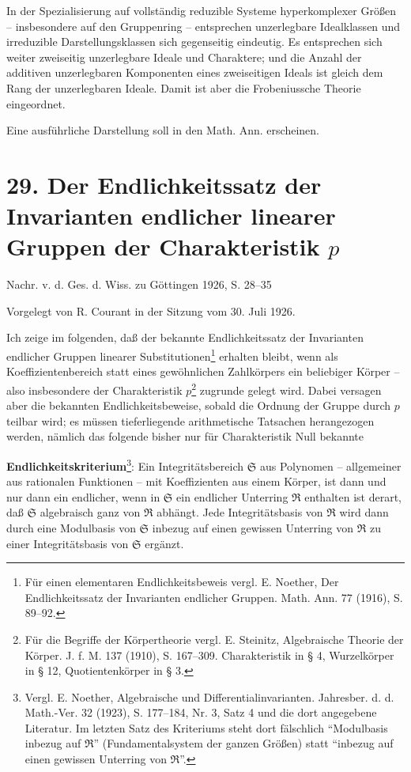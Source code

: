 \documentclass[11pt]{article}
\begin{document}
In der Spezialisierung auf vollständig reduzible Systeme hyperkomplexer Größen -- insbesondere auf den Gruppenring -- entsprechen unzerlegbare Idealklassen und irreduzible Darstellungsklassen sich gegenseitig eindeutig. Es entsprechen sich weiter zweiseitig unzerlegbare Ideale und Charaktere; und die Anzahl der additiven unzerlegbaren Komponenten eines zweiseitigen Ideals ist gleich dem Rang der unzerlegbaren Ideale. Damit ist aber die Frobeniussche Theorie eingeordnet.

Eine ausführliche Darstellung soll in den Math. Ann. erscheinen.

\section*{29. Der Endlichkeitssatz der Invarianten endlicher linearer Gruppen der Charakteristik $p$}

\begin{center}
Nachr. v. d. Ges. d. Wiss. zu Göttingen 1926, S. 28--35
\end{center}

Vorgelegt von R. Courant in der Sitzung vom 30. Juli 1926.

Ich zeige im folgenden, daß der bekannte Endlichkeitssatz der Invarianten endlicher Gruppen linearer Substitutionen\footnote{Für einen elementaren Endlichkeitsbeweis vergl. E. Noether, Der Endlichkeitssatz der Invarianten endlicher Gruppen. Math. Ann. 77 (1916), S. 89--92.} erhalten bleibt, wenn als Koeffizientenbereich statt eines gewöhnlichen Zahlkörpers ein beliebiger Körper -- also insbesondere der Charakteristik $p$\footnote{Für die Begriffe der Körpertheorie vergl. E. Steinitz, Algebraische Theorie der Körper. J. f. M. 137 (1910), S. 167--309. Charakteristik in § 4, Wurzelkörper in § 12, Quotientenkörper in § 3.} zugrunde gelegt wird. Dabei versagen aber die bekannten Endlichkeitsbeweise, sobald die Ordnung der Gruppe durch $p$ teilbar wird; es müssen tieferliegende arithmetische Tatsachen herangezogen werden, nämlich das folgende bisher nur für Charakteristik Null bekannte

\textbf{Endlichkeitskriterium}\footnote{Vergl. E. Noether, Algebraische und Differentialinvarianten. Jahresber. d. d. Math.-Ver. 32 (1923), S. 177--184, Nr. 3, Satz 4 und die dort angegebene Literatur. Im letzten Satz des Kriteriums steht dort fälschlich ``Modulbasis inbezug auf $\mathfrak R$'' (Fundamentalsystem der ganzen Größen) statt ``inbezug auf einen gewissen Unterring von $\mathfrak R$''.}: Ein Integritätsbereich $\mathfrak S$ aus Polynomen -- allgemeiner aus rationalen Funktionen -- mit Koeffizienten aus einem Körper, ist dann und nur dann ein endlicher, wenn in $\mathfrak S$ ein endlicher Unterring $\mathfrak R$ enthalten ist derart, daß $\mathfrak S$ algebraisch ganz von $\mathfrak R$ abhängt. Jede Integritätsbasis von $\mathfrak R$ wird dann durch eine Modulbasis von $\mathfrak S$ inbezug auf einen gewissen Unterring von $\mathfrak R$ zu einer Integritätsbasis von $\mathfrak S$ ergänzt.
\end{document}

